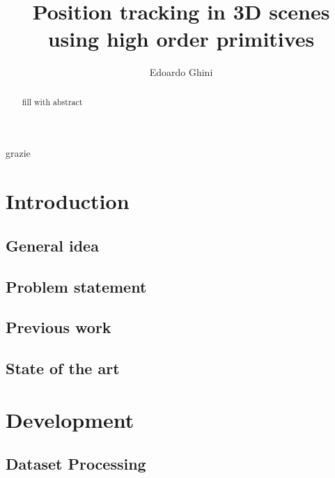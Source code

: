 \documentclass[LaM,binding=0.6cm]{sapthesis}
\title{Position tracking in 3D scenes using high order primitives}
\author{Edoardo Ghini}
\begin{document}
\frontmatter

\maketitle

\dedication{Dedicated to nessuno}

\begin{abstract}
 fill with abstract 
\end{abstract}

\begin{acknowledgments}
  grazie
\end{acknowledgments}

\tableofcontents






\mainmatter

\chapter{Introduction}
\section{General idea}
\section{Problem statement}
\section{Previous work}
\section{State of the art}

\chapter{Development}

\section{Dataset Processing }
\end{document}
